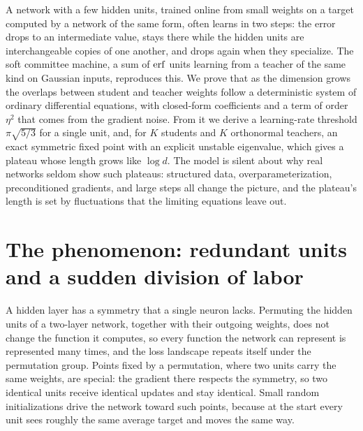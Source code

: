 \newcommand{\committeeM}{\mathsf{M}}
\newcommand{\committeeOm}{\bar\omega}
\newcommand{\committeelu}{\lambda_{\mathrm u}}

\begin{refsection}

\begin{chaptersummary}
A network with a few hidden units, trained online from small weights on a target computed by a network of the same form, often learns in two steps: the error drops to an intermediate value, stays there while the hidden units are interchangeable copies of one another, and drops again when they specialize. The soft committee machine, a sum of $\operatorname{erf}$ units learning from a teacher of the same kind on Gaussian inputs, reproduces this. We prove that as the dimension grows the overlaps between student and teacher weights follow a deterministic system of ordinary differential equations, with closed-form coefficients and a term of order $\eta^2$ that comes from the gradient noise. From it we derive a learning-rate threshold $\pi\sqrt{5/3}$ for a single unit, and, for $K$ students and $K$ orthonormal teachers, an exact symmetric fixed point with an explicit unstable eigenvalue, which gives a plateau whose length grows like $\log d$. The model is silent about why real networks seldom show such plateaus: structured data, overparameterization, preconditioned gradients, and large steps all change the picture, and the plateau's length is set by fluctuations that the limiting equations leave out.
\end{chaptersummary}

\section{The phenomenon: redundant units and a sudden division of labor}\label{sec:committee:phenomenon}

A hidden layer has a symmetry that a single neuron lacks. Permuting the hidden units of a two-layer network, together with their outgoing weights, does not change the function it computes, so every function the network can represent is represented many times, and the loss landscape repeats itself under the permutation group. Points fixed by a permutation, where two units carry the same weights, are special: the gradient there respects the symmetry, so two identical units receive identical updates and stay identical. Small random initializations drive the network toward such points, because at the start every unit sees roughly the same average target and moves the same way.


\end{refsection}
